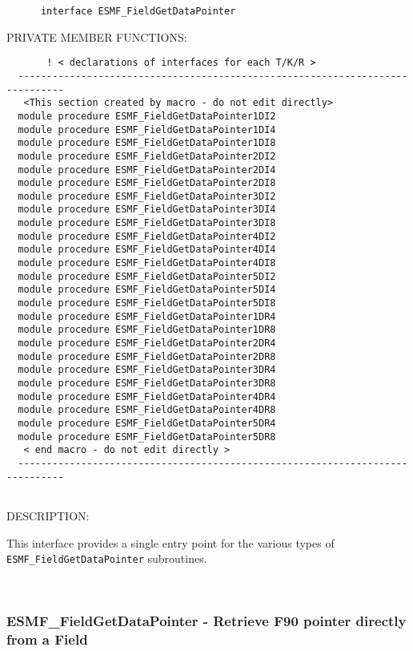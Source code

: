  
\begin{verbatim}      interface ESMF_FieldGetDataPointer
 \end{verbatim}{\sf PRIVATE MEMBER FUNCTIONS:}
\begin{verbatim}       ! < declarations of interfaces for each T/K/R >
  ------------------------------------------------------------------------------ 
   <This section created by macro - do not edit directly> 
  module procedure ESMF_FieldGetDataPointer1DI2 
  module procedure ESMF_FieldGetDataPointer1DI4 
  module procedure ESMF_FieldGetDataPointer1DI8 
  module procedure ESMF_FieldGetDataPointer2DI2 
  module procedure ESMF_FieldGetDataPointer2DI4 
  module procedure ESMF_FieldGetDataPointer2DI8 
  module procedure ESMF_FieldGetDataPointer3DI2 
  module procedure ESMF_FieldGetDataPointer3DI4 
  module procedure ESMF_FieldGetDataPointer3DI8 
  module procedure ESMF_FieldGetDataPointer4DI2 
  module procedure ESMF_FieldGetDataPointer4DI4 
  module procedure ESMF_FieldGetDataPointer4DI8 
  module procedure ESMF_FieldGetDataPointer5DI2 
  module procedure ESMF_FieldGetDataPointer5DI4 
  module procedure ESMF_FieldGetDataPointer5DI8 
  module procedure ESMF_FieldGetDataPointer1DR4 
  module procedure ESMF_FieldGetDataPointer1DR8 
  module procedure ESMF_FieldGetDataPointer2DR4 
  module procedure ESMF_FieldGetDataPointer2DR8 
  module procedure ESMF_FieldGetDataPointer3DR4 
  module procedure ESMF_FieldGetDataPointer3DR8 
  module procedure ESMF_FieldGetDataPointer4DR4 
  module procedure ESMF_FieldGetDataPointer4DR8 
  module procedure ESMF_FieldGetDataPointer5DR4 
  module procedure ESMF_FieldGetDataPointer5DR8 
   < end macro - do not edit directly > 
  ------------------------------------------------------------------------------ 
 
 \end{verbatim}
{\sf DESCRIPTION:\\ }


   This interface provides a single entry point for the various
   types of {\tt ESMF\_FieldGetDataPointer} subroutines.
   
 
\mbox{}\hrulefill\ 
 
\subsubsection [ESMF\_FieldGetDataPointer] {ESMF\_FieldGetDataPointer - Retrieve F90 pointer directly from a Field }


